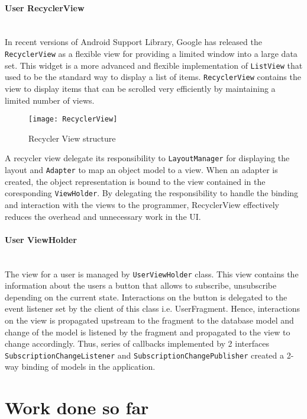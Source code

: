\paragraph{User RecyclerView} \mbox{} \\
In recent versions of Android Support Library, Google has released the \texttt{RecyclerView} as a flexible view for
providing a limited window into a large data set. This widget is a more advanced and flexible implementation of
\texttt{ListView} that used to be the standard way to display a list of items. \texttt{RecyclerView} contains the view
to display items that can be scrolled very efficiently by maintaining a limited number of views\cite{RecyclerView}.
\begin{figure}[h]
    \centering
    \texttt{[image: RecyclerView]}
    \caption{Recycler View structure}
\end{figure}
A recycler view delegate its responsibility to \texttt{LayoutManager} for displaying the layout and \texttt{Adapter} to
map an object model to a view. When an adapter is created, the object representation is bound to the view contained in
the coresponding \texttt{ViewHolder}. By delegating the responsibility to handle the binding and interaction with the
views to the programmer, RecyclerView effectively reduces the overhead and unnecessary work in the UI.

\paragraph{User ViewHolder} \mbox{} \\
The view for a user is managed by \texttt{UserViewHolder} class. This view contains the information about the users a
button that allows to subscribe, unsubscribe depending on the current state. Interactions on the button is delegated to
the event listener set by the client of this class i.e. UserFragment. Hence, interactions on the view is propagated
upstream to the fragment to the database model and change of the model is listened by the fragment and propagated to the
view to change accordingly. Thus, series of callbacks implemented by 2 interfaces \texttt{SubscriptionChangeListener} and
\texttt{SubscriptionChangePublisher} created a 2-way binding of models in the application.

\section{Work done so far}
\label{sec:Work done so far}
